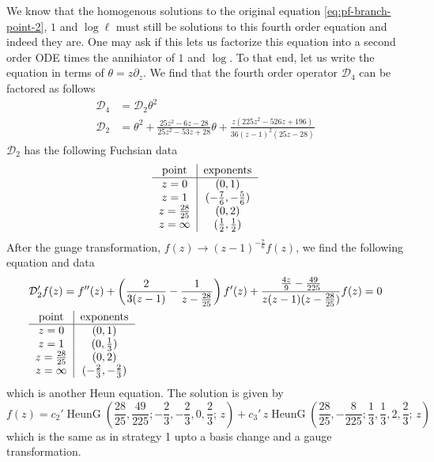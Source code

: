 \documentclass[11pt, a4paper]{article}
\newcommand{\HeunG}{\operatorname{HeunG}}
\numberwithin{equation}{section}
\begin{document}
We know that the homogenous solutions to the original equation \cref{eq:pf-branch-point-2}, $1$ and $\log \ell$ must still be solutions to this fourth order equation and indeed they are. One may ask if this lets us factorize this equation into a second order ODE times the annihiator of $1$ and $\log$. To that end, let us write the equation in terms of $\theta = z \partial_z$. We find that the fourth order operator $\mathcal{D}_4$ can be factored as follows
\begin{equation}
  \begin{aligned}
    \mathcal{D}_4 &= \mathcal{D}_2 \theta^2 \\
    \mathcal{D}_2 &= \theta^2 + \frac{25 z^2-6 z-28}{25 z^2-53 z+28} \theta + \frac{z \left(225 z^2-526 z+196\right)}{36 (z-1)^2 (25 z-28)}
  \end{aligned}
\end{equation}
$\mathcal{D}_2$ has the following Fuchsian data
\begin{equation}
\begin{tabular}{c|c}
point & exponents \\
\hline
$z=0$      & $(0, 1)$ \\
$z=1$      & $(-\tfrac76, -\tfrac56)$ \\
$z=\tfrac{28}{25}$ & $(0, 2)$ \\
$z=\infty$ & $(\tfrac12, \tfrac12)$ \\
\end{tabular}
\end{equation}
After the guage transformation, $f(z) \to (z-1)^{-\tfrac76} f(z)$, we find the following equation and data
\begin{equation}
  \begin{aligned}
  &\mathcal{D}_2'f(z) = f''(z) + \left( \frac{2}{3 (z-1)}-\frac{1}{z-\frac{28}{25}} \right) f'(z) + \frac{\frac{4 z}{9}-\frac{49}{225}}{z(z-1)(z-\frac{28}{25})} f(z) = 0 \\
&\begin{tabular}{c|c}
point & exponents \\
\hline
$z=0$      & $(0, 1)$ \\
$z=1$      & $(0, \tfrac13)$ \\
$z=\tfrac{28}{25}$ & $(0, 2)$ \\
$z=\infty$ & $(-\tfrac23, -\tfrac23)$ \\
\end{tabular}
\end{aligned}
\end{equation}
which is another Heun equation. The solution is given by
\begin{equation}
  f(z) = c_2' \HeunG\!\left(\frac{28}{25},\frac{49}{225};-\frac{2}{3},-\frac{2}{3}, 0,\frac{2}{3};\,z\right) + c_3' \, z \HeunG\!\left(\frac{28}{25},-\frac{8}{225};\frac{1}{3},\frac{1}{3}, 2,\frac{2}{3};\,z\right)
\end{equation}
which is the same as in strategy 1 upto a basis change and a gauge transformation.
\end{document}
